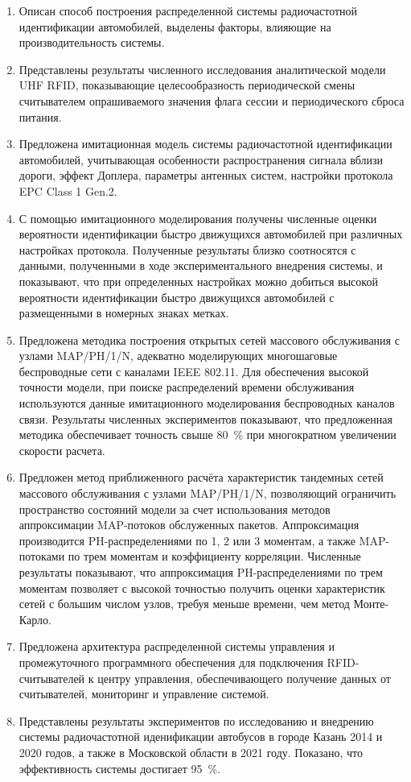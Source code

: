 \begin{enumerate}
  \item Описан способ построения распределенной системы радиочастотной идентификации автомобилей, выделены факторы, влияющие на производительность системы.
  \item Представлены результаты численного исследования аналитической модели UHF RFID, показывающие целесообразность периодической смены считывателем опрашиваемого значения флага сессии и периодического сброса питания.
  \item Предложена имитационная модель системы радиочастотной идентификации автомобилей, учитывающая особенности распространения сигнала вблизи дороги, эффект Доплера, параметры антенных систем, настройки протокола EPC Class 1 Gen.2.
  \item С помощью имитационного моделирования получены численные оценки вероятности идентификации быстро движущихся автомобилей при различных настройках протокола. Полученные результаты близко соотносятся с данными, полученными в ходе экспериментального внедрения системы, и показывают, что при определенных настройках можно добиться высокой вероятности идентификации быстро движущихся автомобилей с размещенными в номерных знаках метках.
  \item Предложена методика построения открытых сетей массового обслуживания с узлами MAP/PH/1/N, адекватно моделирующих многошаговые беспроводные сети с каналами IEEE 802.11. Для обеспечения высокой точности модели, при поиске распределений времени обслуживания используются данные имитационного моделирования беспроводных каналов связи. Результаты численных экспериментов показывают, что предложенная методика обеспечивает точность свыше 80~\% при многократном увеличении скорости расчета.
  \item Предложен метод приближенного расчёта характеристик тандемных сетей массового обслуживания с узлами MAP/PH/1/N,   позволяющий ограничить пространство состояний модели за счет использования методов аппроксимации MAP-потоков обслуженных пакетов. Аппроксимация производится PH-распределениями по 1, 2 или 3 моментам, а также MAP-потоками по трем моментам и коэффициенту корреляции. Численные результаты показывают, что аппроксимация PH-распределениями по трем моментам позволяет с высокой точностью получить оценки характеристик сетей с большим числом узлов, требуя меньше времени, чем метод Монте-Карло.
  \item Предложена архитектура распределенной системы управления и промежуточного программного обеспечения для подключения RFID-считывателей к центру управления, обеспечивающего получение данных от считывателей, мониторинг и управление системой.
  \item Представлены результаты экспериментов по исследованию и внедрению системы радиочастотной иденификации автобусов в городе Казань 2014 и 2020 годов, а также в Московской области в 2021 году. Показано, что эффективность системы достигает 95~\%.
\end{enumerate}
